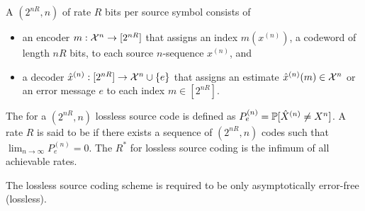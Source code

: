 \documentclass[11pt,a4paper]{article}
\begin{document}


\begin{definition}
    A $(2^{nR},n)$  of rate $R$ bits per source symbol consists of 
    \begin{itemize}
        \item an encoder $m:\mathcal{X}^n\rightarrow [2^{nR}]$ that assigns an index $m(x^{(n)})$, a codeword of length $nR$ bits, to each source $n$-sequence $x^{(n)}$, and
        \item a decoder $\hat{x}^{(n)}:[2^{nR}]\rightarrow \mathcal{X}^{n}\cup \{e\}$ that assigns an estimate $\hat{x}^{(n)}(m)\in\mathcal{X}^n$ or an error message $e$ to each index $m\in[2^{nR}]$.
    \end{itemize}
\end{definition}

\begin{definition}
    The  for a $(2^{nR}, n)$ lossless source code is defined as $P^{(n)}_e = \mathbb{P}[\hat{X}^{(n)}\neq X^n]$. A rate $R$ is said to be  if there exists a sequence of $(2^{nR}, n)$ codes such that $\lim_{n\rightarrow \infty} P_e^{(n)} = 0$. The  $R^*$ for lossless source coding is the infimum of all achievable rates.
\end{definition}

\begin{remark}
    The lossless source coding scheme is required to be only asymptotically error-free (lossless).
\end{remark}
\end{document}
